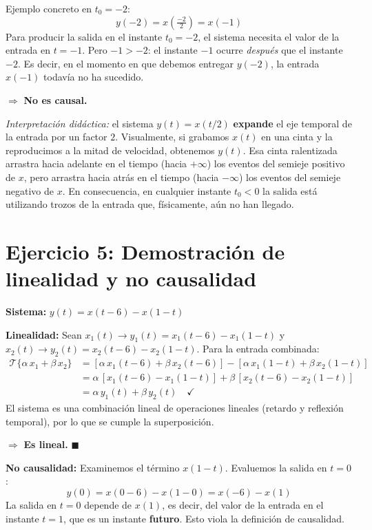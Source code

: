 \documentclass[10pt,a4paper]{article}
\begin{document}
\begin{enumerate}[label=\textbf{\alph*)}]
		Ejemplo concreto en $t_0 = -2$:
		\[
		y(-2) = x\!\left(\tfrac{-2}{2}\right) = x(-1)
		\]
		Para producir la salida en el instante $t_0 = -2$, el sistema necesita el valor de la entrada en $t = -1$. Pero $-1 > -2$: el instante $-1$ ocurre \textit{después} que el instante $-2$. Es decir, en el momento en que debemos entregar $y(-2)$, la entrada $x(-1)$ todavía no ha sucedido.

		$\Rightarrow$ \textbf{No es causal.}

		\textit{Interpretación didáctica:} el sistema $y(t) = x(t/2)$ \textbf{expande} el eje temporal de la entrada por un factor $2$. Visualmente, si grabamos $x(t)$ en una cinta y la reproducimos a la mitad de velocidad, obtenemos $y(t)$. Esa cinta ralentizada arrastra hacia adelante en el tiempo (hacia $+\infty$) los eventos del semieje positivo de $x$, pero arrastra hacia atrás en el tiempo (hacia $-\infty$) los eventos del semieje negativo de $x$. En consecuencia, en cualquier instante $t_0 < 0$ la salida está utilizando trozos de la entrada que, físicamente, aún no han llegado.
	\end{enumerate}

	\section*{Ejercicio 5: Demostración de linealidad y no causalidad}
	
	\textbf{Sistema:} $y(t) = x(t-6) - x(1-t)$
	
	\textbf{Linealidad:} Sean $x_1(t) \to y_1(t) = x_1(t-6) - x_1(1-t)$ y $x_2(t) \to y_2(t) = x_2(t-6) - x_2(1-t)$. Para la entrada combinada:
	\begin{align*}
	\mathcal{T}\{\alpha\,x_1 + \beta\,x_2\} &= [\alpha\,x_1(t-6) + \beta\,x_2(t-6)] - [\alpha\,x_1(1-t) + \beta\,x_2(1-t)] \\
	&= \alpha\,[x_1(t-6) - x_1(1-t)] + \beta\,[x_2(t-6) - x_2(1-t)] \\
	&= \alpha\,y_1(t) + \beta\,y_2(t) \quad \checkmark
	\end{align*}
	El sistema es una combinación lineal de operaciones lineales (retardo y reflexión temporal), por lo que se cumple la superposición.
	
	$\Rightarrow$ \textbf{Es lineal.} $\blacksquare$
	
	\textbf{No causalidad:} Examinemos el término $x(1-t)$. Evaluemos la salida en $t = 0$:
	\[
	y(0) = x(0-6) - x(1-0) = x(-6) - x(1)
	\]
	La salida en $t = 0$ depende de $x(1)$, es decir, del valor de la entrada en el instante $t = 1$, que es un instante \textbf{futuro}. Esto viola la definición de causalidad.
	
\end{document}
